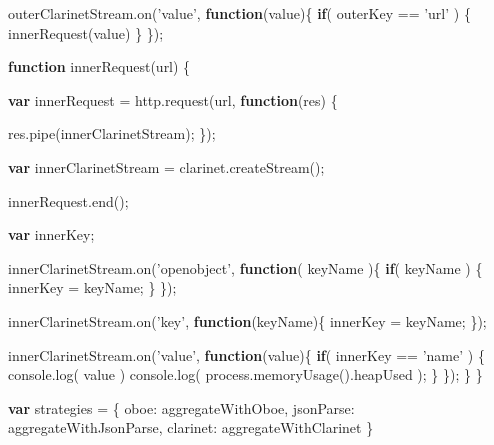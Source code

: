 \documentclass[12pt, ]{article}
\newenvironment{Shaded}{}{}
\newcommand{\KeywordTok}[1]{\textcolor[rgb]{0.00,0.44,0.13}{\textbf{{#1}}}}
\newcommand{\DataTypeTok}[1]{\textcolor[rgb]{0.56,0.13,0.00}{{#1}}}
\newcommand{\StringTok}[1]{\textcolor[rgb]{0.25,0.44,0.63}{{#1}}}
\newcommand{\OtherTok}[1]{\textcolor[rgb]{0.00,0.44,0.13}{{#1}}}
\newcommand{\FunctionTok}[1]{\textcolor[rgb]{0.02,0.16,0.49}{{#1}}}
\newcommand{\NormalTok}[1]{{#1}}
\begin{document}
\begin{Shaded}
\begin{Highlighting}[]
   \OtherTok{outerClarinetStream}\NormalTok{.}\FunctionTok{on}\NormalTok{(}\StringTok{'value'}\NormalTok{, }\KeywordTok{function}\NormalTok{(value)\{}
      \KeywordTok{if}\NormalTok{( outerKey == }\StringTok{'url'} \NormalTok{) \{}
         \FunctionTok{innerRequest}\NormalTok{(value)}
      \NormalTok{\}}
   \NormalTok{\});      }
   
   
   \KeywordTok{function} \FunctionTok{innerRequest}\NormalTok{(url) \{}
      
      \KeywordTok{var} \NormalTok{innerRequest = }\OtherTok{http}\NormalTok{.}\FunctionTok{request}\NormalTok{(url, }\KeywordTok{function}\NormalTok{(res) \{}
                                 
         \OtherTok{res}\NormalTok{.}\FunctionTok{pipe}\NormalTok{(innerClarinetStream);}
      \NormalTok{\});}
      
      \KeywordTok{var} \NormalTok{innerClarinetStream = }\OtherTok{clarinet}\NormalTok{.}\FunctionTok{createStream}\NormalTok{();}
      
      \OtherTok{innerRequest}\NormalTok{.}\FunctionTok{end}\NormalTok{();            }
      
      \KeywordTok{var} \NormalTok{innerKey;}
      
      \OtherTok{innerClarinetStream}\NormalTok{.}\FunctionTok{on}\NormalTok{(}\StringTok{'openobject'}\NormalTok{, }\KeywordTok{function}\NormalTok{( keyName )\{      }
         \KeywordTok{if}\NormalTok{( keyName ) \{}
            \NormalTok{innerKey = keyName;      }
         \NormalTok{\}}
      \NormalTok{\});}
      
      \OtherTok{innerClarinetStream}\NormalTok{.}\FunctionTok{on}\NormalTok{(}\StringTok{'key'}\NormalTok{, }\KeywordTok{function}\NormalTok{(keyName)\{}
         \NormalTok{innerKey = keyName;}
      \NormalTok{\});}
      
      \OtherTok{innerClarinetStream}\NormalTok{.}\FunctionTok{on}\NormalTok{(}\StringTok{'value'}\NormalTok{, }\KeywordTok{function}\NormalTok{(value)\{}
         \KeywordTok{if}\NormalTok{( innerKey == }\StringTok{'name'} \NormalTok{) \{}
            \OtherTok{console}\NormalTok{.}\FunctionTok{log}\NormalTok{( value )}
            \OtherTok{console}\NormalTok{.}\FunctionTok{log}\NormalTok{( }\OtherTok{process}\NormalTok{.}\FunctionTok{memoryUsage}\NormalTok{().}\FunctionTok{heapUsed} \NormalTok{);            }
         \NormalTok{\}}
      \NormalTok{\});            }
   \NormalTok{\}}
\NormalTok{\}}

\KeywordTok{var} \NormalTok{strategies = \{}
   \DataTypeTok{oboe}\NormalTok{:       aggregateWithOboe,}
   \DataTypeTok{jsonParse}\NormalTok{:  aggregateWithJsonParse,}
   \DataTypeTok{clarinet}\NormalTok{:   aggregateWithClarinet}
\NormalTok{\}}


\end{Highlighting}
\end{Shaded}
\end{document}
